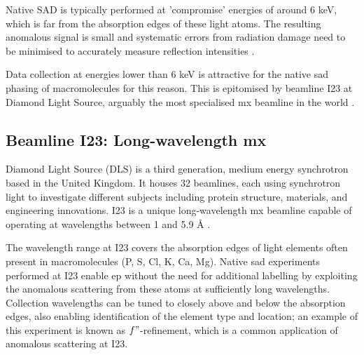 Native \ac{SAD} is typically performed at 'compromise' energies of around 6 keV, which is far from the absorption edges of these light atoms. The resulting anomalous signal is small and systematic errors from radiation damage need to be minimised to accurately measure reflection intensities \cite{DjinovicCarugo2005}.%

Data collection at energies lower than 6 keV is attractive for the native \ac{sad} phasing of macromolecules for this reason. This is epitomised by beamline I23 at Diamond Light Source, arguably the most specialised \ac{mx} beamline in the world \cite{Foerster2019}. %

\subsection{Beamline I23: Long-wavelength \ac{mx}}

Diamond Light Source (DLS) is a third generation, medium energy synchrotron based in the United Kingdom. It houses 32 beamlines, each using synchrotron light to investigate different subjects including protein structure, materials, and engineering innovations.
I23 is a unique long-wavelength \ac{mx} beamline capable of operating at wavelengths between 1 and 5.9 Å \cite{Wagner2016}.

The wavelength range at I23 covers the absorption edges of 
light elements often present in macromolecules (P, S, Cl, K, Ca, Mg).
Native \ac{sad} experiments performed at I23 enable \ac{ep} without the need for additional labelling by exploiting the anomalous scattering from these atoms at sufficiently long wavelengths.
Collection wavelengths can be tuned to closely above and below the absorption edges, also enabling identification of the element type and location; an example of this experiment is known as $f"$-refinement, which is a common application of anomalous scattering at I23.%

